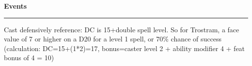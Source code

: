 \documentclass[letterpaper]{article}
\newcommand{\B}[1]{\textbf{#1}}
\newenvironment{notesection}[1]
{ {\huge \B{#1}}\hrule\vspace{0.5em}\begingroup\fontsize{9pt}{12pt}\selectfont}
{\endgroup}
\begin{document}
\begin{notesection}{Events}










Cast defensively reference: DC is 15+double spell level.  So for Trostram, a face value of 7 or higher on a D20 for a level 1 spell, or 70\% chance of success (calculation: DC=15+(1*2)=17, bonus=caster level 2 + ability modifier 4 + feat bonus of 4 = 10)

\end{notesection}
\end{document}
